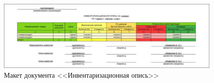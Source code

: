

\begin{figure}[!h]
    \centering

    \includegraphics[width=17cm]
    {assets/layouts/DOC_InventOpis'.jpg}

    \caption{Макет документа <<Инвентаризационная опись>>}

    \label{fig:DOC_InventOpis}
\end{figure}

